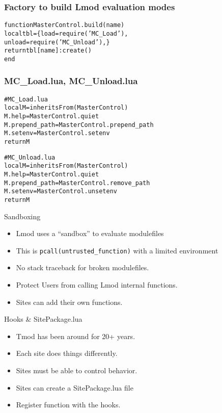 \documentclass{beamer}
\begin{document}
\begin{frame}[fragile]
    \frametitle{Factory to build Lmod evaluation modes}
    {\small
      \begin{alltt}
          function MasterControl.build(name)
            local tbl = \{ load = require('MC_Load'),
                          unload = require('MC_Unload'), \}
            return tbl[name]:create()
          end

      \end{alltt}
    }
\end{frame}

\begin{frame}[fragile]
    \frametitle{MC\_Load.lua, MC\_Unload.lua}
    {\small
      \begin{alltt}
# MC_Load.lua
local M        = inheritsFrom(MasterControl)
M.help         = MasterControl.quiet
M.prepend_path = MasterControl.prepend_path
M.setenv       = MasterControl.setenv
return M

# MC_Unload.lua
local M        = inheritsFrom(MasterControl)
M.help         = MasterControl.quiet
M.prepend_path = MasterControl.remove_path
M.setenv       = MasterControl.unsetenv
return M
      \end{alltt}
    }
\end{frame}    


\begin{frame}{Sandboxing}
  \begin{itemize}
    \item Lmod uses a ``sandbox'' to evaluate modulefiles
    \item This is \texttt{pcall(untrusted\_function)} with a limited
      environment 
    \item No stack traceback for broken modulefiles.
    \item Protect Users from calling Lmod internal functions.
    \item Sites can add their own functions.
  \end{itemize}
\end{frame}

\begin{frame}{Hooks \& SitePackage.lua}
  \begin{itemize}
    \item Tmod has been around for 20+ years.
    \item Each site does things differently.
    \item Sites must be able to control behavior.
    \item Sites can create a SitePackage.lua file
    \item Register function with the hooks.
  \end{itemize}
\end{frame}
\end{document}
